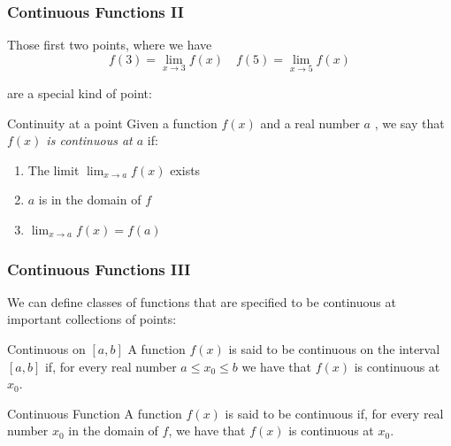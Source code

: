 \documentclass{ltx-talk}
\begin{document}
\begin{frame}
  \frametitle{Continuous Functions II}

  Those first two points, where we have
  \begin{equation*}
    f(3) = \lim_{x \rightarrow 3} f(x) \quad f(5) = \lim_{x \rightarrow 5} f(x)
  \end{equation*}

  are a special kind of point: \pause

  \begin{block}{Continuity at a point}
    Given a function $f(x)$ and a real number $a$ , \pause
    we say that \textit{$f(x)$ is continuous at $a$} if: \pause
    \begin{enumerate}
      \item The limit $\lim_{x \rightarrow a} f(x)$ exists \pause
      \item $a$ is in the domain of $f$ \pause
      \item $\lim_{x \rightarrow a} f(x) = f(a)$
    \end{enumerate}
  \end{block}
\end{frame}

\begin{frame}
  \frametitle{Continuous Functions III}

  We can define classes of functions that are specified to be continuous at important collections of points: \pause

  \begin{block}{Continuous on $[a,b]$}
    A function $f(x)$ is said to be continuous on the interval $[a,b]$
    if, \pause for every real number $a \leq x_0 \leq b$ \pause
    we have that $f(x)$ is continuous at $x_0$. \pause
  \end{block}

  \begin{block}{Continuous Function}
    A function $f(x)$ is said to be continuous if, \pause for every real number $x_0$ in the domain of $f$, \pause
    we have that $f(x)$ is continuous at $x_0$.
  \end{block}
\end{frame}
\end{document}
